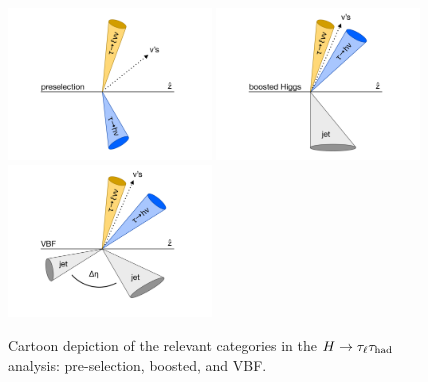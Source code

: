 \begin{figure}[tp]
  \centering
  \includegraphics[width=0.48\textwidth]{figures/category-cartoons/presel}
  \includegraphics[width=0.48\textwidth]{figures/category-cartoons/boost}
  \includegraphics[width=0.48\textwidth]{figures/category-cartoons/vbf}
  \caption{Cartoon depiction of the relevant categories in the $H\rightarrow\tau_\ell\tau_\text{had}$ analysis: pre-selection, boosted, and VBF.}
  \label{fig:strategy-category-cartoons}
\end{figure}

\clearpage

